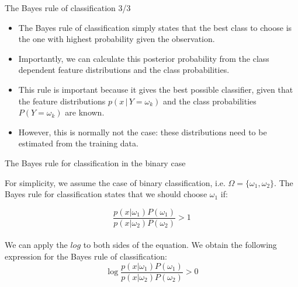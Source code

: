 \documentclass[xcolor=pdftex,dvipsnames,table]{beamer}
\begin{document}
\begin{frame}{The Bayes rule of classification 3/3}

\begin{itemize}
\item The Bayes rule of classification simply states that the best class to choose is the one with highest probability given the observation.
\item Importantly, we can calculate this posterior probability from the class dependent feature distributions and the class probabilities.
\item This rule is important because it gives the best possible classifier, given that the feature distributions $p(x\,|\,Y=\omega_k)$ and the class probabilities $P(Y=\omega_k)$ are known.
\item However, this is normally not the case: these distributions need to be estimated from the training data.

\end{itemize}

\end{frame}

\begin{frame}{The Bayes rule for classification in the binary case}

For simplicity, we assume the case of binary classification, i.e. $\Omega = \{\omega_1, \omega_2\}$. The Bayes rule for classification states that we should choose $\omega_1$ if:

\begin{equation*}
\frac{p(x|\omega_1)P(\omega_1)}{p(x|\omega_2)P(\omega_2)} > 1
\end{equation*}
\\
We can apply the $log$ to both sides of the equation. We obtain the following expression for the Bayes rule of classification:
\begin{equation}\label{equ:lda:condition}
\log{ \frac{p(x|\omega_1)P(\omega_1)}{p(x|\omega_2)P(\omega_2)} } > 0
\end{equation}

\end{frame}
\end{document}
